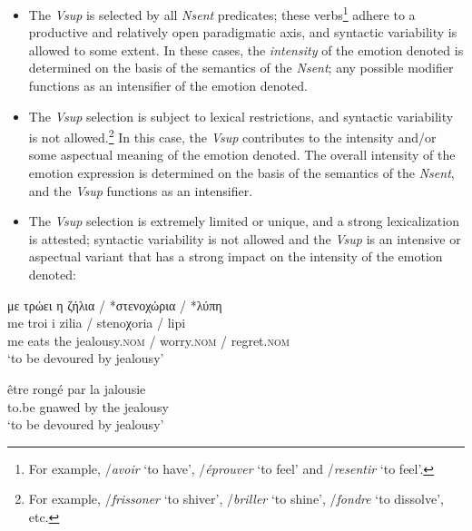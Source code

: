 \documentclass[output=paper]{langsci/langscibook}
\begin{document}
\begin{itemize}
\item {}
The \textit{Vsup} is selected by all \textit{Nsent }predicates; these
verbs\footnote{For example, 
/\textit{avoir} ‘to have’,
/\textit{éprouver} ‘to feel’ and
/\textit{resentir} ‘to feel’.} 
adhere to a
productive and relatively open paradigmatic axis, and syntactic
variability is allowed to some extent. In these cases, the
\textit{intensity} of the emotion denoted is determined on the basis of
the semantics of the \textit{Nsent}; any possible modifier functions as
an intensifier of the emotion denoted. 
\item 
The \textit{Vsup} selection is subject to lexical restrictions, and
syntactic variability is not allowed.\footnote{For example,
/\textit{frissoner} ‘to shiver’, /\textit{briller} ‘to shine’,
/\textit{fondre} ‘to dissolve’, etc.} In this case, the \textit{Vsup}
contributes to the intensity and/or some aspectual
meaning of the emotion denoted. The overall intensity of the
emotion expression is determined on the basis of the semantics of the
\textit{Nsent}, and the \textit{Vsup} functions as an intensifier.
\item 
The \textit{Vsup }selection is extremely limited or unique, and a strong
lexicalization is attested; syntactic variability is not allowed and
the \textit{Vsup} is an intensive or aspectual variant that has a
strong impact on the intensity of the emotion denoted:
\end{itemize}


\begin{exe}
\ex \label{ex:3:45}
\glll με τρώει η ζήλια / *στενοχώρια / *λύπη \\
me  troi i zilia / stenoχoria / lipi\\
me eats the jealousy.\textsc{nom} /  worry.\textsc{nom} / regret.\textsc{nom}\\
\glt %
‘to be devoured by jealousy’
\end{exe}

\begin{exe}
\ex \label{ex:3:46} 
\gll être rongé par la jalousie\\
to.be gnawed by the jealousy\\
\glt ‘to be devoured by jealousy’
\end{exe}
\end{document}
